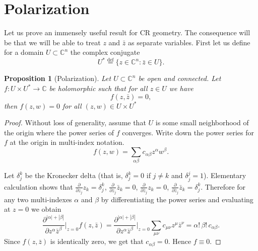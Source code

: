 \documentclass[12pt,openany]{book}
\newcommand{\abs}[1]{\left\lvert {#1} \right\rvert}
\newcommand{\C}{{\mathbb{C}}}
\newcommand{\sectionnewpage}{}
\theoremstyle{plain}
\newtheorem{prop}[thm]{Proposition}
\theoremstyle{remark}
\theoremstyle{definition}
\theoremstyle{exercise}
\theoremstyle{example}
\begin{document}

\sectionnewpage
\section{Polarization} \label{sec:polarization}

Let us prove an immensely useful result for CR geometry.  The consequence
will be that we will be able to treat $z$ and $\bar{z}$ as separate
variables.  First let us define for a domain $U \subset \C^n$
the complex conjugate
\begin{equation}
U^* \overset{\text{def}}{=} \{ z \in \C^n : \bar{z} \in U \} .
\end{equation}

\begin{prop}[Polarization]
Let $U \subset \C^n$ be open and connected.
Let $f \colon U \times U^* \to \C$ be holomorphic such that
for all $z \in U$ we have
\begin{equation}
f(z,\bar{z}) = 0 ,
\end{equation}
then $f(z,w) = 0$ for all $(z,w) \in U \times U^*$
\end{prop}

\begin{proof}
Without loss of generality, assume that $U$ is some small 
neighborhood of the origin where the power series of $f$ converges.
Write down the power series for $f$ at the origin in multi-index
notation.
\begin{equation}
f(z,w) = \sum_{\alpha \beta} c_{\alpha \beta} z^\alpha w^\beta .
\end{equation}

Let $\delta_j^k$ be the Kronecker delta (that is, $\delta_j^k = 0$
if $j \not= k$ and $\delta_j^j = 1$).
Elementary calculation shows that
$\frac{\partial}{\partial z_j} z_k = \delta_j^k$,
$\frac{\partial}{\partial z_j} \bar{z}_k = 0$,
$\frac{\partial}{\partial \bar{z}_j} z_k = 0$,
$\frac{\partial}{\partial \bar{z}_j} \bar{z}_k = \delta_j^k$.
Therefore
for any two multi-indexes $\alpha$ and $\beta$
by differentiating the power series and evaluating at $z=0$
we obtain
\begin{equation}
\frac{\partial^{\abs{\alpha}+\abs{\beta}}}{\partial
z^\alpha \bar{z}^\beta} \Bigg|_{z=0}
f(z,\bar{z})
=
\frac{\partial^{\abs{\alpha}+\abs{\beta}}}{\partial
z^\alpha \bar{z}^\beta} \Bigg|_{z=0}
\sum_{\mu \nu} c_{\mu \nu} z^\mu \bar{z}^\nu
= \alpha ! \, \beta ! \, c_{\alpha \beta} .
\end{equation}
Since $f(z,\bar{z})$ is identically zero, we get that $c_{\alpha \beta} = 0$.
Hence $f \equiv 0$.
\end{proof}
\end{document}
